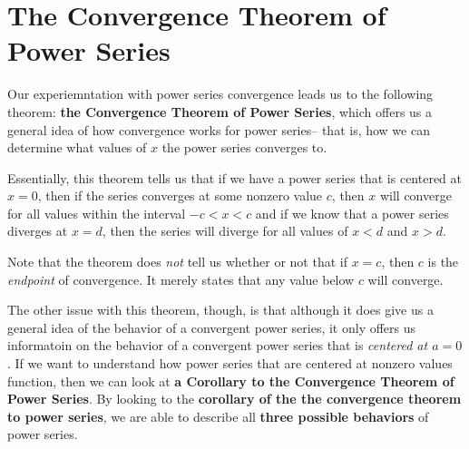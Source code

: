 \section{The Convergence Theorem of Power Series}
Our experiemntation with power series convergence
leads us to the following theorem: \textbf{the Convergence
  Theorem of Power Series}, which offers us a general
idea of how convergence works for power series-- that is,
how we can determine what values of $ x $ the power
series converges to.
\begin{center}
\end{center}
Essentially, this theorem tells us that if we have a
power series that is centered at $ x = 0 $, then if the
series converges at some nonzero value $ c $, then $ x $
will converge for all values within the interval $ - c < x
< c $ and if we know that a power series diverges at $ x = d $,
then the series will diverge for all values of $ x < d $ and
$ x > d $.
\par Note that the theorem does \textit{not} tell us
whether or not that if $ x = c $, then $ c $ is the
\textit{endpoint} of convergence. It merely states that any value
below $ c $ will converge.
\par The other issue with this theorem, though, is that
although it does give us a general idea of the behavior
of a convergent power series, it only offers us informatoin
on the behavior of a convergent power series that is
\textit{centered at $ a = 0 $}. If we want to understand
how power series that are centered at nonzero values
function, then we can look at \textbf{a Corollary to the
  Convergence Theorem of Power Series}. By looking to the
\textbf{corollary of the the convergence theorem to power series},
we are able to describe all \textbf{three possible behaviors} of
power series.

